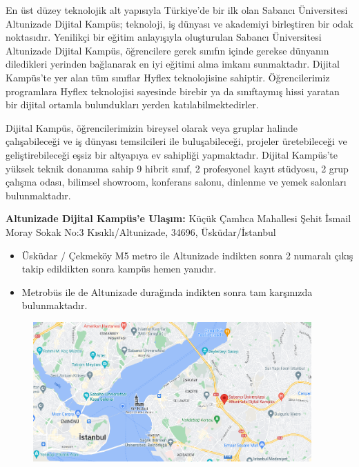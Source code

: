 \vspace*{-4ex}

En üst düzey teknolojik alt yapısıyla Türkiye’de bir ilk olan Sabancı Üniversitesi Altunizade Dijital Kampüs; teknoloji, iş dünyası ve akademiyi birleştiren bir odak noktasıdır.
Yenilikçi bir eğitim anlayışıyla oluşturulan Sabancı Üniversitesi Altunizade Dijital Kampüs, öğrencilere gerek sınıfın içinde gerekse dünyanın diledikleri yerinden bağlanarak en
iyi eğitimi alma imkanı sunmaktadır. Dijital Kampüs’te yer alan tüm sınıflar Hyflex teknolojisine sahiptir.
Öğrencilerimiz programlara Hyflex teknolojisi sayesinde birebir ya da sınıftaymış hissi yaratan bir dijital ortamla bulundukları yerden katılabilmektedirler.

Dijital Kampüs, öğrencilerimizin bireysel olarak veya gruplar halinde çalışabileceği ve iş dünyası temsilcileri ile buluşabileceği, projeler üretebileceği ve geliştirebileceği eşsiz bir altyapıya ev sahipliği yapmaktadır.
Dijital Kampüs’te yüksek teknik donanıma sahip 9 hibrit sınıf, 2 profesyonel kayıt stüdyosu, 2 grup çalışma odası, bilimsel showroom, konferans salonu, dinlenme ve yemek salonları bulunmaktadır.

\textbf{Altunizade Dijital Kampüs'e Ulaşım:} Küçük Çamlıca Mahallesi Şehit İsmail Moray Sokak No:3 Kısıklı/Altunizade, 34696, Üsküdar/İstanbul

\begin{itemize}
  \setlength{\itemsep}{0pt}
  \setlength{\parskip}{0pt}
	\item Üsküdar / Çekmeköy M5 metro ile Altunizade indikten sonra 2 numaralı çıkış takip edildikten sonra kampüs hemen yanıdır.
	\item Metrobüs ile de Altunizade durağında indikten sonra tam karşınızda bulunmaktadır.
\end{itemize}

\begin{figure}
\centering
\vspace*{-8ex}
\includegraphics[width=0.95\textwidth]{altunizade_2.png}
\end{figure}
